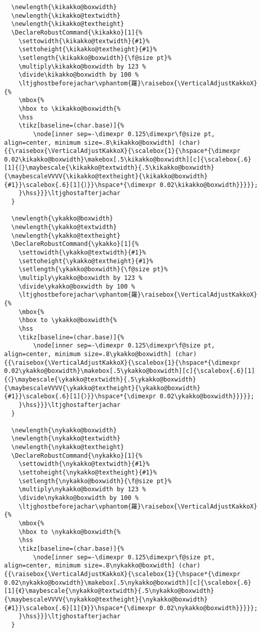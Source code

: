 \documentclass[luatex,fontsize=10pt,paper=b5,twoside]{jlreq}%
\begin{document}
\begin{lstlisting}
  \newlength{\kikakko@boxwidth}
  \newlength{\kikakko@textwidth}
  \newlength{\kikakko@textheight}
  \DeclareRobustCommand{\kikakko}[1]{%
    \settowidth{\kikakko@textwidth}{#1}%
    \settoheight{\kikakko@textheight}{#1}%
    \setlength{\kikakko@boxwidth}{\f@size pt}%
    \multiply\kikakko@boxwidth by 123 %
    \divide\kikakko@boxwidth by 100 %
    \ltjghostbeforejachar\vphantom{羅}\raisebox{\VerticalAdjustKakkoX}{%
    \mbox{%
    \hbox to \kikakko@boxwidth{%
    \hss
    \tikz[baseline=(char.base)]{%
        \node[inner sep=-\dimexpr 0.125\dimexpr\f@size pt, align=center, minimum size=.8\kikakko@boxwidth] (char) {{\raisebox{\VerticalAdjustKakkoX}{\scalebox{1}{\hspace*{\dimexpr 0.02\kikakko@boxwidth}\makebox[.5\kikakko@boxwidth][c]{\scalebox{.6}[1]{〔}\maybescale{\kikakko@textwidth}{.5\kikakko@boxwidth}{\maybescaleVVVV{\kikakko@textheight}{\kikakko@boxwidth}{#1}}\scalebox{.6}[1]{〕}}\hspace*{\dimexpr 0.02\kikakko@boxwidth}}}}};
    }\hss}}}\ltjghostafterjachar
  }

  \newlength{\ykakko@boxwidth}
  \newlength{\ykakko@textwidth}
  \newlength{\ykakko@textheight}
  \DeclareRobustCommand{\ykakko}[1]{%
    \settowidth{\ykakko@textwidth}{#1}%
    \settoheight{\ykakko@textheight}{#1}%
    \setlength{\ykakko@boxwidth}{\f@size pt}%
    \multiply\ykakko@boxwidth by 123 %
    \divide\ykakko@boxwidth by 100 %
    \ltjghostbeforejachar\vphantom{羅}\raisebox{\VerticalAdjustKakkoX}{%
    \mbox{%
    \hbox to \ykakko@boxwidth{%
    \hss
    \tikz[baseline=(char.base)]{%
        \node[inner sep=-\dimexpr 0.125\dimexpr\f@size pt, align=center, minimum size=.8\ykakko@boxwidth] (char) {{\raisebox{\VerticalAdjustKakkoX}{\scalebox{1}{\hspace*{\dimexpr 0.02\ykakko@boxwidth}\makebox[.5\ykakko@boxwidth][c]{\scalebox{.6}[1]{〈}\maybescale{\ykakko@textwidth}{.5\ykakko@boxwidth}{\maybescaleVVVV{\ykakko@textheight}{\ykakko@boxwidth}{#1}}\scalebox{.6}[1]{〉}}\hspace*{\dimexpr 0.02\ykakko@boxwidth}}}}};
    }\hss}}}\ltjghostafterjachar
  }

  \newlength{\nykakko@boxwidth}
  \newlength{\nykakko@textwidth}
  \newlength{\nykakko@textheight}
  \DeclareRobustCommand{\nykakko}[1]{%
    \settowidth{\nykakko@textwidth}{#1}%
    \settoheight{\nykakko@textheight}{#1}%
    \setlength{\nykakko@boxwidth}{\f@size pt}%
    \multiply\nykakko@boxwidth by 123 %
    \divide\nykakko@boxwidth by 100 %
    \ltjghostbeforejachar\vphantom{羅}\raisebox{\VerticalAdjustKakkoX}{%
    \mbox{%
    \hbox to \nykakko@boxwidth{%
    \hss
    \tikz[baseline=(char.base)]{%
        \node[inner sep=-\dimexpr 0.125\dimexpr\f@size pt, align=center, minimum size=.8\nykakko@boxwidth] (char) {{\raisebox{\VerticalAdjustKakkoX}{\scalebox{1}{\hspace*{\dimexpr 0.02\nykakko@boxwidth}\makebox[.5\nykakko@boxwidth][c]{\scalebox{.6}[1]{《}\maybescale{\nykakko@textwidth}{.5\nykakko@boxwidth}{\maybescaleVVVV{\nykakko@textheight}{\nykakko@boxwidth}{#1}}\scalebox{.6}[1]{》}}\hspace*{\dimexpr 0.02\nykakko@boxwidth}}}}};
    }\hss}}}\ltjghostafterjachar
  }


\end{lstlisting}
\end{document}
